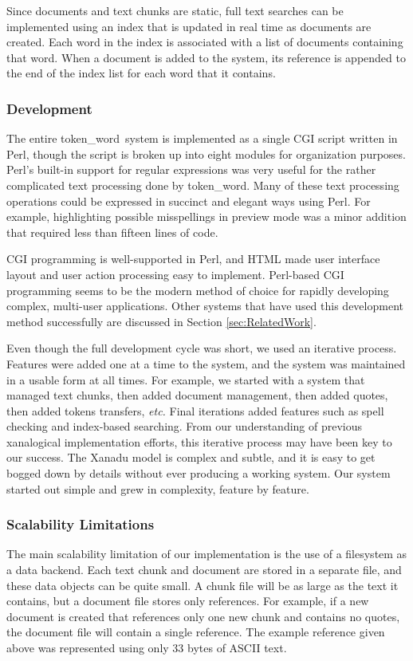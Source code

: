 \documentclass{acm_proc_article-sp}
\newcommand{\tw}{token\_word}
\begin{document}
Since documents and text chunks are static, full text searches can be implemented using an index that is updated in real time as documents are created.
Each word in the index is associated with a list of documents containing that word.
When a document is added to the system, its reference is appended to the end of the index list for each word that it contains.


\subsubsection{Development}
The entire \tw \  system is implemented as a single CGI script written in Perl, though the script is broken up into eight modules for organization purposes.
Perl's built-in support for regular expressions was very useful for the rather complicated text processing done by \tw.
Many of these text processing operations could be expressed in succinct and elegant ways using Perl.
For example, highlighting possible misspellings in preview mode was a minor addition that required less than fifteen lines of code.

CGI programming is well-supported in Perl, and HTML made user interface layout and user action processing easy to implement.
Perl-based CGI programming seems to be the modern method of choice for rapidly developing complex, multi-user applications.
Other systems that have used this development method successfully are discussed in Section \ref{sec:RelatedWork}.

Even though the full development cycle was short, we used an iterative process.
Features were added one at a time to the system, and the system was maintained in a usable form at all times.
For example, we started with a system that managed text chunks, then added document management, then added quotes, then added tokens transfers, {\it etc.}
Final iterations added features such as spell checking and index-based searching.
From our understanding of previous xanalogical implementation efforts, this iterative process may have been key to our success.
The Xanadu model is complex and subtle, and it is easy to get bogged down by details without ever producing a working system.
Our system started out simple and grew in complexity, feature by feature.


\subsubsection{Scalability Limitations}
The main scalability limitation of our implementation is the use of a filesystem as a data backend.
Each text chunk and document are stored in a separate file, and these data objects can be quite small.
A chunk file will be as large as the text it contains, but a document file stores only references.
For example, if a new document is created that references only one new chunk and contains no quotes, the document file will contain a single reference.
The example reference given above was represented using only 33 bytes of ASCII text.
\end{document}
